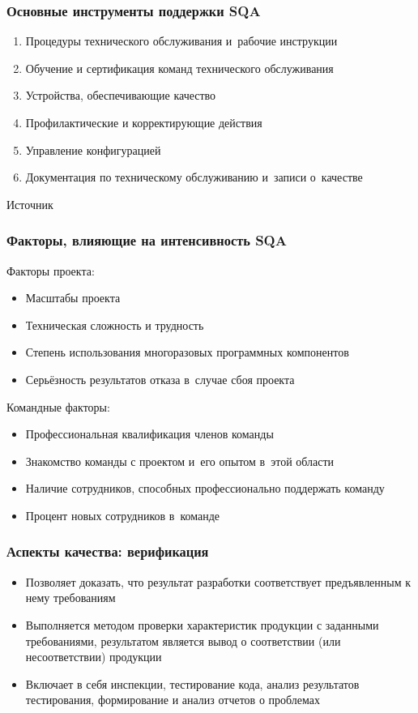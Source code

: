 \documentclass{../industrial-development}
\begin{document}
\begin{frame} \frametitle{Основные инструменты поддержки SQA}
 	 \begin{enumerate}
\item Процедуры технического обслуживания и~рабочие инструкции
\item Обучение и сертификация команд технического обслуживания
\item Устройства, обеспечивающие качество
\item Профилактические и корректирующие действия
\item Управление конфигурацией
\item Документация по техническому обслуживанию и~записи о~качестве
  	\end{enumerate}
\end{frame}

\lecturenotes

Источник~\cite[с.~274]{SQA-Galin}



\begin{frame} \frametitle{Факторы, влияющие на интенсивность SQA}
Факторы проекта:
 	 \begin{itemize}
\item\small Масштабы проекта
\item\small Техническая сложность и трудность
\item\small Степень использования многоразовых программных компонентов
\item\small Серьёзность результатов отказа в~случае сбоя проекта
  	\end{itemize}
Командные факторы:
 	 \begin{itemize}
\item\small Профессиональная квалификация членов команды
\item\small Знакомство команды с проектом и~его опытом в~этой области
\item\small Наличие сотрудников, способных профессионально поддержать команду
\item\small Процент новых сотрудников в~команде~
  	\end{itemize}
\end{frame}
 


\begin{frame} \frametitle{Аспекты качества: верификация}
 	 \begin{itemize}
\item Позволяет доказать, что результат разработки соответствует предъявленным к нему требованиям
\item Выполняется методом проверки характеристик продукции с заданными требованиями, результатом является вывод о соответствии (или несоответствии) продукции
\item Включает в себя инспекции, тестирование кода, анализ результатов тестирования, формирование и анализ отчетов о проблемах
  	\end{itemize}
\end{frame}
 
\end{document}
